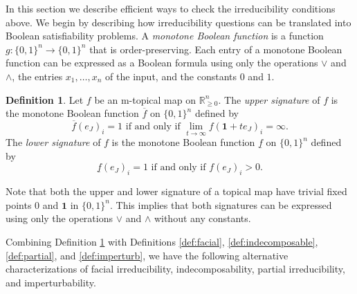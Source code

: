 \documentclass[10pt,reqno]{amsart}
\newcommand{\R}{\mathbb{R}}
\newcommand{\sign}{\operatorname{sgn}}
\theoremstyle{plain}
\theoremstyle{definition}
\newtheorem{definition}[theorem]{Definition}
\numberwithin{equation}{section}
\begin{document}
In this section we describe efficient ways to check the irreducibility conditions above. We begin by describing how irreducibility questions can be translated into Boolean satisfiability problems. 
A \emph{monotone Boolean function} is a function $g: \{0,1\}^n \rightarrow \{0, 1\}^n$ that is order-preserving. %
Each entry of a monotone Boolean function can be expressed as a Boolean formula using only the operations $\vee$ and $\wedge$, the entries $x_1, \ldots, x_n$ of the input, and the constants $0$ and $1$.   

\begin{definition} \label{def:sig1}
Let $f$ be an m-topical map on $\R^n_{\ge 0}$. The \emph{upper signature} of $f$ is the monotone Boolean function $\overline{f}$ on $\{0,1\}^n$ defined by 
$$\overline{f}(e_J)_i = 1 \text{ if and only if } \lim_{t \rightarrow \infty} f(\mathbf{1} + t e_J)_i = \infty.$$ 
The \emph{lower signature} of $f$ is the monotone Boolean function $\underline{f}$ on $\{0,1\}^n$ defined by
$$\underline{f}(e_J)_i = 1 \text{ if and only if } f(e_J)_i > 0.$$
\end{definition}

Note that both the upper and lower signature of a topical map have trivial fixed points $0$ and $\mathbf{1}$ in $\{0,1\}^n$.  This implies that both signatures can be expressed using only the operations $\vee$ and $\wedge$ without any constants.  

Combining Definition \ref{def:sig1} with Definitions \ref{def:facial}, \ref{def:indecomposable}, \ref{def:partial}, and \ref{def:imperturb}, we have the following alternative characterizations of facial irreducibility, indecomposability, partial irreducibility, and imperturbability. 
\end{document}
